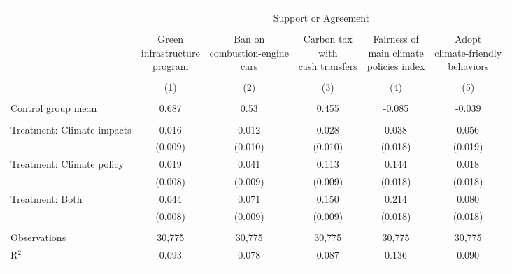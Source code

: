 
\begin{tabular}{@{\extracolsep{5pt}}lccccc} 
\\[-1.8ex]\hline 
\hline \\[-1.8ex] 
 & \multicolumn{5}{c}{Support or Agreement} \\ 
\cline{2-6} 
\\[-1.8ex] & \makecell{Green\\infrastructure\\program} & \makecell{Ban on\\combustion-engine\\cars} & \makecell{Carbon tax\\with\\cash transfers} & \makecell{Fairness of\\main climate\\policies index} & \makecell{Adopt\\climate-friendly\\behaviors} \\ 
\\[-1.8ex] & (1) & (2) & (3) & (4) & (5)\\ 
\hline \\[-1.8ex] 
Control group mean & 0.687 & 0.53 & 0.455 & -0.085 & -0.039  \\ \hline \\[-1.8ex]
 Treatment: Climate impacts & 0.016 & 0.012 & 0.028 & 0.038 & 0.056 \\ 
  & (0.009) & (0.010) & (0.010) & (0.018) & (0.019) \\ 
  Treatment: Climate policy & 0.019 & 0.041 & 0.113 & 0.144 & 0.018 \\ 
  & (0.008) & (0.009) & (0.009) & (0.018) & (0.018) \\ 
  Treatment: Both & 0.044 & 0.071 & 0.150 & 0.214 & 0.080 \\ 
  & (0.008) & (0.009) & (0.009) & (0.018) & (0.018) \\ 
 \hline \\[-1.8ex] 

Observations & 30,775 & 30,775 & 30,775 & 30,775 & 30,775 \\ 
R$^{2}$ & 0.093 & 0.078 & 0.087 & 0.136 & 0.090 \\ 
\hline 
\hline \\[-1.8ex] 
\end{tabular} 
